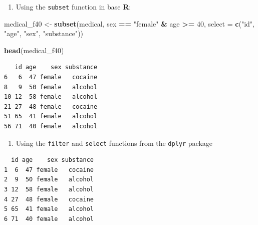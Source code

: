 \documentclass[]{book}
\newenvironment{Shaded}{\begin{snugshade}}{\end{snugshade}}
\newcommand{\DataTypeTok}[1]{\textcolor[rgb]{0.13,0.29,0.53}{#1}}
\newcommand{\DecValTok}[1]{\textcolor[rgb]{0.00,0.00,0.81}{#1}}
\newcommand{\KeywordTok}[1]{\textcolor[rgb]{0.13,0.29,0.53}{\textbf{#1}}}
\newcommand{\NormalTok}[1]{#1}
\newcommand{\OperatorTok}[1]{\textcolor[rgb]{0.81,0.36,0.00}{\textbf{#1}}}
\newcommand{\StringTok}[1]{\textcolor[rgb]{0.31,0.60,0.02}{#1}}
\providecommand{\tightlist}{%
  \setlength{\itemsep}{0pt}\setlength{\parskip}{0pt}}
\begin{document}
\begin{enumerate}
\def\labelenumi{\arabic{enumi}.}
\tightlist
\item
  Using the \texttt{subset} function in base \textbf{R}:
\end{enumerate}

\begin{Shaded}
\begin{Highlighting}[]
\NormalTok{medical_f40 <-}\StringTok{ }\KeywordTok{subset}\NormalTok{(medical, sex }\OperatorTok{==}\StringTok{ "female"} \OperatorTok{&}\StringTok{ }\NormalTok{age }\OperatorTok{>=}\StringTok{ }\DecValTok{40}\NormalTok{, }
                      \DataTypeTok{select =} \KeywordTok{c}\NormalTok{(}\StringTok{"id"}\NormalTok{, }\StringTok{"age"}\NormalTok{, }\StringTok{"sex"}\NormalTok{, }\StringTok{"substance"}\NormalTok{))}

\KeywordTok{head}\NormalTok{(medical_f40)}
\end{Highlighting}
\end{Shaded}

\begin{verbatim}
   id age    sex substance
6   6  47 female   cocaine
8   9  50 female   alcohol
10 12  58 female   alcohol
21 27  48 female   cocaine
51 65  41 female   alcohol
56 71  40 female   alcohol
\end{verbatim}

\begin{enumerate}
\def\labelenumi{\arabic{enumi}.}
\setcounter{enumi}{1}
\tightlist
\item
  Using the \texttt{filter} and \texttt{select} functions from the \texttt{dplyr} package
\end{enumerate}

\begin{Shaded}
\end{Shaded}

\begin{verbatim}
  id age    sex substance
1  6  47 female   cocaine
2  9  50 female   alcohol
3 12  58 female   alcohol
4 27  48 female   cocaine
5 65  41 female   alcohol
6 71  40 female   alcohol
\end{verbatim}
\end{document}
